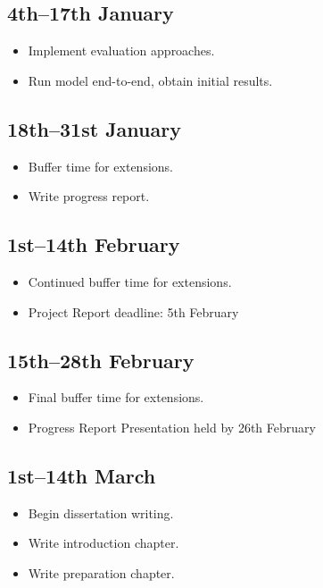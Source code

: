 \documentclass{article}
\begin{document}
\subsection{4th--17th January}
\begin{itemize}
    \item Implement evaluation approaches.
    \item Run model end-to-end, obtain initial results.
\end{itemize}

\subsection{18th--31st January}
\begin{itemize}
    \item Buffer time for extensions.
    \item Write progress report.
\end{itemize}

\subsection{1st--14th February}
\begin{itemize}
    \item Continued buffer time for extensions.
    \item Project Report deadline: 5th February
\end{itemize}

\subsection{15th--28th February}
\begin{itemize}
    \item Final buffer time for extensions.
    \item Progress Report Presentation held by 26th February
\end{itemize}

\subsection{1st--14th March}
\begin{itemize}
    \item Begin dissertation writing.
    \item Write introduction chapter.
    \item Write preparation chapter.
\end{itemize}
\end{document}
